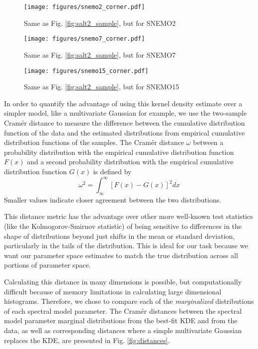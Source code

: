 \begin{figure}
    \centering
\texttt{[image: figures/snemo2\_corner.pdf]}
    \caption{Same as Fig. \ref{fig:salt2_sample}, but for SNEMO2}
    \label{fig:snemo2_sample}
\end{figure}

\begin{figure}
    \centering
\texttt{[image: figures/snemo7\_corner.pdf]}
    \caption{Same as Fig. \ref{fig:salt2_sample}, but for SNEMO7}
    \label{fig:snemo7_sample}
\end{figure}

\begin{figure}
    \centering
\texttt{[image: figures/snemo15\_corner.pdf]}
    \caption{Same as Fig. \ref{fig:salt2_sample}, but for SNEMO15}
    \label{fig:snemo15_sample}
\end{figure}

In order to quantify the advantage of using this kernel density estimate over a simpler model, like a multivariate Gaussian for example, we use the two-sample Cram\'{e}r distance \citep{Cramer1928} to measure the difference between the cumulative distribution function of the data and the estimated distributions from empirical cumulative distribution functions of the samples.
The Cram\'{e}r distance $\omega$ between a probability distribution with the empirical cumulative distribution function $F(x)$ and a second probability distribution with the empirical cumulative distribution function $G(x)$ is defined by
\begin{equation}
    \omega^2 = \displaystyle \int_\infty^\infty [F(x)-G(x)]^2 dx
\end{equation}
Smaller values indicate closer agreement between the two distributions.

This distance metric has the advantage over other more well-known test statistics (like the Kolmogorov-Smirnov statistic) of being sensitive to differences in the shape of distributions beyond just shifts in the mean or standard deviation, particularly in the tails of the distribution. This is ideal for our task because we want our parameter space estimates to match the true distribution across all portions of parameter space.

Calculating this distance in many dimensions is possible, but computationally difficult because of memory limitations in calculating large dimensional histograms. Therefore, we chose to compare each of the \emph{marginalized} distributions of each spectral model parameter. The Cram\'{e}r distances between the spectral model parameter marginal distributions from the best-fit KDE and from the data, as well as corresponding distances where a simple multivariate Gaussian replaces the KDE, are presented in Fig. \ref{fig:distances}.

